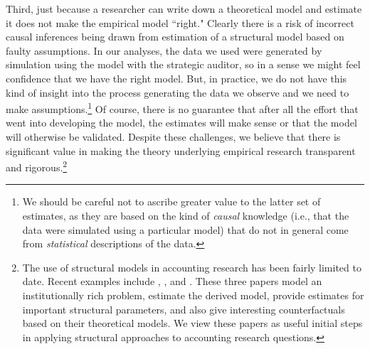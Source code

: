 Third, just because a researcher can write down a theoretical model and estimate it does not make the empirical model ``right."
Clearly there is a risk of incorrect causal inferences being drawn from estimation of a structural model based on faulty assumptions.
In our analyses, the data we used were generated by simulation using the model with the strategic auditor, so in a sense we might feel confidence that we have the right model.
But, in practice, we do not have this kind of insight into the process generating the data we observe and we need to make assumptions.\footnote{We should be careful not to ascribe greater value to the latter set of estimates, as they are based on the kind of \emph{causal} knowledge (i.e., that the data were simulated using a particular model) that do not in general come from \emph{statistical} descriptions of the data.}
Of course, there is no guarantee that after all the effort that went into developing the model, the estimates will make sense or that the model will otherwise be validated.
Despite these challenges, we believe that there is significant value in making the theory underlying empirical research transparent and rigorous.\footnote{The use of structural models in accounting research has been fairly limited to date.  
Recent examples include \citet{Gerakos:2013cl}, \citet{Zakolyukina:2015aa}, and \citet{Bertomeu:2015aa}.  
These three papers model an institutionally rich problem, estimate the derived model, provide estimates for important structural parameters, and also give interesting counterfactuals based on their theoretical models. 
We view these papers as useful initial steps in applying structural approaches to accounting research questions.}


